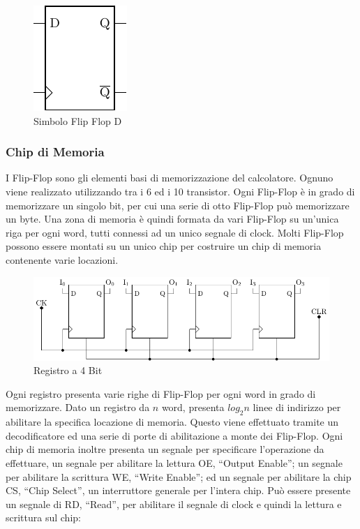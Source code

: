 \documentclass{article}
\numberwithin{equation}{subsection}
\begin{document}
\begin{figure}[H]%
    \centering%
    \includegraphics{flip-flop-d-compatti.pdf}%
    \caption{Simbolo Flip Flop D}%
\end{figure}


\subsubsection{Chip di Memoria}

I Flip-Flop sono gli elementi basi di memorizzazione del calcolatore. Ognuno viene realizzato utilizzando tra i 6 ed i 10 transistor. Ogni Flip-Flop è in grado di memorizzare un singolo bit, per cui una 
serie di otto Flip-Flop può memorizzare un byte. Una zona di memoria è quindi formata da vari Flip-Flop su un'unica riga per ogni word, tutti connessi ad un unico segnale di clock. Molti Flip-Flop possono 
essere montati su un unico chip per costruire un chip di memoria contenente varie locazioni. 

\begin{figure}[H]%
    \centering%
    \includegraphics{chip-4-bit.pdf}%
    \caption{Registro a 4 Bit}%
\end{figure}

Ogni registro presenta varie righe di Flip-Flop per ogni word in grado di memorizzare. Dato un registro da $n$ word, presenta $log_2n$ linee di indirizzo per abilitare la specifica locazione di memoria. Questo 
viene effettuato tramite un decodificatore ed una serie di porte di abilitazione a monte dei Flip-Flop. Ogni chip di memoria inoltre presenta un segnale per specificare l'operazione da effettuare, un segnale 
per abilitare la lettura OE, ``Output Enable''; un segnale per abilitare la scrittura WE, ``Write Enable''; ed un segnale per abilitare la chip CS, ``Chip Select'', un interruttore generale per l'intera chip. 
Può essere presente un segnale di RD, ``Read'', per abilitare il segnale di clock e quindi la lettura e scrittura sul chip:
\end{document}
